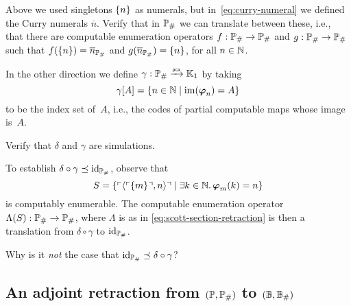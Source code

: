 \begin{exercise}
  Above we used singletons $\set{n}$ as numerals, but in~\eqref{eq:curry-numeral} we defined the Curry numerals $\overline{n}$. Verify that in $\comp{\Scott}$ we can translate between these, i.e., that there are computable enumeration operators $f : \comp{\Scott} \to \comp{\Scott}$ and $g : \comp{\Scott} \to \comp{\Scott}$ such that $f(\set{n}) = \overline{n}_{\comp{\Scott}}$ and $g(\overline{n}_{\comp{\Scott}}) = \set{n}$, for all $n \in \NN$.
\end{exercise}

In the other direction we define $\gamma: \comp{\Scott} \pcato \klone$ by taking
% 
\begin{equation*}
  \gamma[A] = \set{n \in \NN \such \im{\xpr_n} = A}
\end{equation*}
%
to be the index set of~$A$, i.e., the codes of partial computable maps whose image is~$A$.

\begin{exercise}
  Verify that $\delta$ and $\gamma$ are simulations.
\end{exercise}

To establish $\delta \circ \gamma \preceq \id[\comp{\Scott}]$, observe that
%
\begin{equation*}
  S = \set{ \code{\pair{\code{\set{m}}, n}} \such \some{k \in \NN} \pr{m}{k} = n }
\end{equation*}
%
is computably enumerable. The computable enumeration operator $\Lambda(S) : \comp{\Scott} \to \comp{\Scott}$, where $\Lambda$ is as in \eqref{eq:scott-section-retraction} is then a translation from $\delta \circ \gamma$ to $\id[\comp{\Scott}]$.

\begin{exercise}
  Why is it \emph{not} the case that $\id[\comp{\Scott}] \preceq \delta \circ \gamma$?
\end{exercise}


\subsection[\texorpdfstring{An adjoint retraction from $(\Scott, \comp{\Scott})$ to $(\Baire, \comp{\Baire})$}{An adjoint retraction from P to B}]
{An adjoint retraction from $(\Scott, \comp{\Scott})$ to $(\Baire, \comp{\Baire})$}
\label{sec:retraction-PP-BB}%

